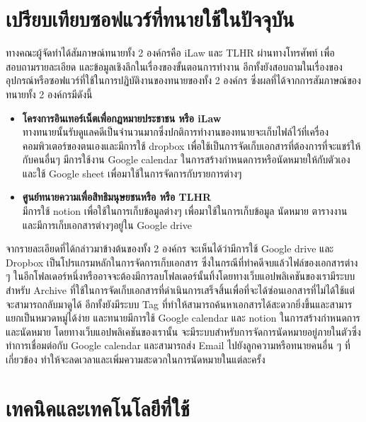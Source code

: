\documentclass[12pt,oneside,openright,a4paper]{cpe-thai-project}
\begin{document}
\section{เปรียบเทียบซอฟแวร์ที่ทนายใช้ในปัจจุบัน}
\hspace*{1cm} ทางคณะผู้จัดทำได้สัมภาษณ์ทนายทั้ง 2 องค์กรคือ iLaw และ TLHR ผ่านทางโทรศัพท์ เพื่อสอบถามรายละเอียด และข้อมูลเชิงลึกในเรื่องของขั้นตอนการทำงาน อีกทั้งยังสอบถามในเรื่องของอุปกรณ์หรือซอฟแวร์ที่ใช้ในการปฏิบัติงานของทนายของทั้ง 2 องค์กร ซึ่งผลที่ได้จากการสัมภาษณ์ของทนายทั้ง 2 องค์กรมีดังนี้
\begin{itemize}
  \item \textbf{โครงการอินเทอร์เน็ตเพื่อกฎหมายประชาชน หรือ iLaw} \\
  \hspace*{1cm} ทางทนายนั้นรับดูแลคดีเป็นจำนวนมากซึ่งปกติการทำงานของทนายจะเก็บไฟล์ไว้ที่เครื่องคอมพิวเตอร์ของตนเองและมีการใช้ dropbox เพื่อใช้เป็นการจัดเก็บเอกสารที่ต้องการที่จะแชร์ให้กับคนอื่นๆ มีการใช้งาน Google calendar ในการสร้างกำหนดการหรือนัดหมายให้กับตัวเอง และใช้ Google sheet เพื่อมาใช้ในการจัดการกับรายการต่างๆ 
  \item \textbf{ศูนย์ทนายความเพื่อสิทธิมนุษยชนหรือ หรือ TLHR} \\
  \hspace*{1cm} มีการใช้ notion เพื่อใช้ในการเก็บข้อมูลต่างๆ เพื่อมาใช้ในการเก็บข้อมูล นัดหมาย ตารางงาน และมีการเก็บเอกสารต่างๆอยู่ใน Google drive  
\end{itemize}
\hspace*{1cm} จากรายละเอียดที่ได้กล่าวมาข้างต้นของทั้ง 2 องค์กร จะเห็นได้ว่ามีการใช้ Google drive และ Dropbox เป็นโปรแกรมหลักในการจัดการเก็บเอกสาร ซึ่งในกรณีที่ทำคดีจบแล้วไฟล์ของเอกสารต่าง ๆ ในอีกโฟลเดอร์หนึ่งหรืออาจจะต้องมีการลบโฟลเดอร์นั้นทิ้งโดยทางเว็บแอปพลิเคชันของเรามีระบบสำหรับ Archive ที่ใช้ในการจัดเก็บเอกสารที่ดำเนินการเสร็จสิ้นเพื่อที่จะได้ซ่อนเอกสารที่ไม่ได้ใช้แต่จะสามารถกลับมาดูได้ อีกทั้งยังมีระบบ Tag ที่ทำให้สามารถค้นหาเอกสารได้สะดวกยิ่งขึ้นและสามารแยกเป็นหมวดหมู่ได้ง่าย และทนายมีการใช้ Google calendar และ notion ในการสร้างกำหนดการและนัดหมาย โดยทางเว็บแอปพลิเคชันของเรานั้น จะมีระบบสำหรับการจัดการนัดหมายอยู่ภายในตัวซึ่งทำการเชื่อมต่อกับ Google calendar และสามารถส่ง Email ไปยังลูกความหรือทนายคนอื่น ๆ ที่เกี่ยวข้อง ทำให้จะลดเวลาและเพิ่มความสะดวกในการนัดหมายในแต่ละครั้ง



\section{เทคนิคและเทคโนโลยีที่ใช้}
\end{document}
